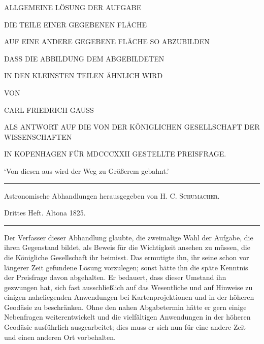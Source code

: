 \clearpage
{}
\thispagestyle{empty}
\vspace*{.35in}
\begin{center}
{\large ALLGEMEINE LÖSUNG DER AUFGABE}\par\bigskip
{\Large DIE TEILE EINER GEGEBENEN FLÄCHE}\par\bigskip
AUF EINE ANDERE GEGEBENE FLÄCHE SO ABZUBILDEN\par\bigskip
DASS DIE ABBILDUNG DEM ABGEBILDETEN\par\bigskip
IN DEN KLEINSTEN TEILEN ÄHNLICH WIRD\par\vspace{28pt}
VON\par\vspace{28pt}
{\large CARL FRIEDRICH GAUSS}\par\vspace{30pt}
{\small ALS ANTWORT AUF DIE VON DER KÖNIGLICHEN GESELLSCHAFT DER WISSENSCHAFTEN\par
IN KOPENHAGEN FÜR MDCCCXXII GESTELLTE PREISFRAGE.}\par\bigskip
\end{center}
\begin{flushright}‘Von diesen aus wird der Weg zu Größerem gebahnt.’\end{flushright}
\vfill
\begin{center}
\rule{.8\linewidth}{.3pt}\par\smallskip
Astronomische Abhandlungen herausgegeben von H. C. \textsc{Schumacher}.\par
Drittes Heft. Altona 1825.\par\smallskip
\rule{.8\linewidth}{.3pt}
\end{center}
\clearpage
{}
Der Verfasser dieser Abhandlung glaubte, die zweimalige Wahl der Aufgabe, die ihren Gegenstand bildet, als Beweis für die Wichtigkeit ansehen zu müssen, die die Königliche Gesellschaft ihr beimisst. Das ermutigte ihn, ihr seine schon vor längerer Zeit gefundene Lösung vorzulegen; sonst hätte ihn die späte Kenntnis der Preisfrage davon abgehalten. Er bedauert, dass dieser Umstand ihn gezwungen hat, sich fast ausschließlich auf das Wesentliche und auf Hinweise zu einigen naheliegenden Anwendungen bei Kartenprojektionen und in der höheren Geodäsie zu beschränken. Ohne den nahen Abgabetermin hätte er gern einige Nebenfragen weiterentwickelt und die vielfältigen Anwendungen in der höheren Geodäsie ausführlich ausgearbeitet; dies muss er sich nun für eine andere Zeit und einen anderen Ort vorbehalten.


